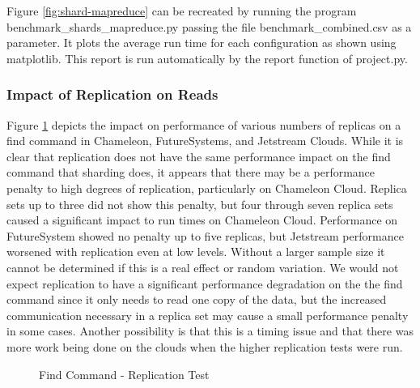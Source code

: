 \documentclass[9pt,twocolumn,twoside]{../../styles/osajnl}
\begin{document}
Figure \ref{fig:shard-mapreduce} can be recreated by running the program benchmark\_shards\_mapreduce.py passing the file benchmark\_combined.csv as a parameter.  It plots the average run time for each configuration as shown using matplotlib. This report is run automatically by the report function of project.py.

\subsubsection{Impact of Replication on Reads}




Figure \ref{fig:replica-find} depicts the impact on performance of various numbers of replicas on a find command in Chameleon, FutureSystems, and Jetstream Clouds.  While it is clear that replication does not have the same performance impact on the find command that sharding does, it appears that there may be a performance penalty to high degrees of replication, particularly on Chameleon Cloud.  Replica sets up to three did not show this penalty, but four through seven replica sets caused a significant impact to run times on Chameleon Cloud.  Performance on FutureSystem showed no penalty up to five replicas, but Jetstream performance worsened with replication even at low levels.  Without a larger sample size it cannot be determined if this is a real effect or random variation.  We would not expect replication to have a significant performance degradation on the the find command since it only needs to read one copy of the data, but the increased communication necessary in a replica set may cause a small performance penalty in some cases.  Another possibility is that this is a timing issue and that there was more work being done on the clouds when the higher replication tests were run.

\begin{figure}[htbp]
\centering
{}
\caption{Find Command - Replication Test}
\label{fig:replica-find}
\end{figure}
\end{document}
